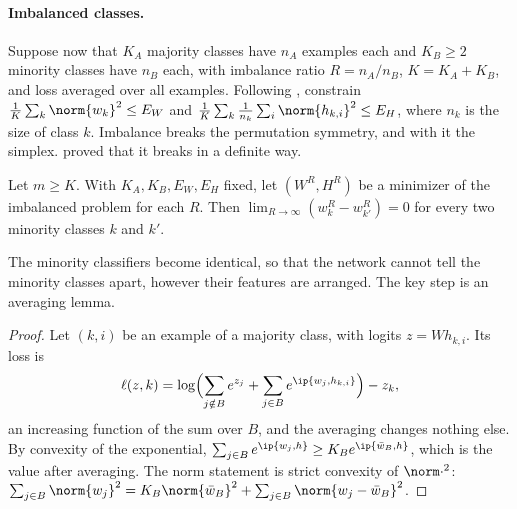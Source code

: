 \begin{refsection}
\paragraph{Imbalanced classes.} Suppose now that $K_A$ majority classes have $n_A$ examples each and $K_B\ge2$ minority classes have $n_B$ each, with imbalance ratio $R=n_A/n_B$, $K=K_A+K_B$, and loss averaged over all examples. Following \textcite{FangEtAl2021}, constrain $\frac1K\sum_k\norm{w_k}^2\le E_W$ and $\frac1K\sum_k\frac1{n_k}\sum_i\norm{h_{k,i}}^2\le E_H$, where $n_k$ is the size of class $k$. Imbalance breaks the permutation symmetry, and with it the simplex. \Textcite{FangEtAl2021} proved that it breaks in a definite way.

\begin{theorem}\label{thm:collapse:minority}
Let $m\ge K$. With $K_A,K_B,E_W,E_H$ fixed, let $(W^R,H^R)$ be a minimizer of the imbalanced problem for each $R$. Then $\lim_{R\to\infty}(w^R_k-w^R_{k'})=0$ for every two minority classes $k$ and $k'$.
\end{theorem}

The minority classifiers become identical, so that the network cannot tell the minority classes apart, however their features are arranged. The key step is an averaging lemma.


\begin{proof}
Let $(k,i)$ be an example of a majority class, with logits $z=Wh_{k,i}$. Its loss is
\[
  \ell(z,k)=\log\Bigl(\sum_{j\notin B}e^{z_j}+\sum_{j\in B}e^{\ip{w_j,h_{k,i}}}\Bigr)-z_k ,
\]
an increasing function of the sum over $B$, and the averaging changes nothing else. By convexity of the exponential, $\sum_{j\in B}e^{\ip{w_j,h}}\ge K_Be^{\ip{\bar w_B,h}}$, which is the value after averaging. The norm statement is strict convexity of $\norm\cdot^2$: $\sum_{j\in B}\norm{w_j}^2=K_B\norm{\bar w_B}^2+\sum_{j\in B}\norm{w_j-\bar w_B}^2$.
\end{proof}


\end{refsection}
